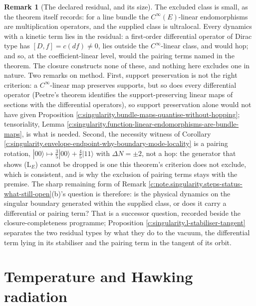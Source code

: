 \documentclass[11pt]{article}
\theoremstyle{definition}
\newtheorem{remark}[theorem]{Remark}
\theoremstyle{plain}
\begin{document}
\begin{remark}[The declared residual, and its size]\label{c:note.singularity.declared-residual-size}
The excluded class is small, as the theorem itself records: for a line bundle the $C^\infty(E)$-linear endomorphisms are multiplication operators, and the supplied class is ultralocal. Every dynamics with a kinetic term lies in the residual: a first-order differential operator of Dirac type has $[D, f] = c(df) \neq 0$, lies outside the $C^\infty$-linear class, and would hop; and so, at the coefficient-linear level, would the pairing terms named in the theorem. The closure constructs none of these, and nothing here excludes one in nature. Two remarks on method. First, support preservation is not the right criterion: a $C^\infty$-linear map preserves supports, but so does every differential operator (Peetre's theorem identifies the support-preserving linear maps of sections with the differential operators), so support preservation alone would not have given Proposition \ref{c:singularity.bundle-maps-quantise-without-hopping}; tensoriality, Lemma \ref{c:singularity.function-linear-endomorphisms-are-bundle-maps}, is what is needed. Second, the necessity witness of Corollary \ref{c:singularity.envelope-endpoint-why-boundary-mode-locality} is a pairing rotation, $|00\rangle \mapsto \tfrac35|00\rangle + \tfrac45|11\rangle$ with $\Delta N = \pm 2$, not a hop: the generator that shows (L$_E$) cannot be dropped is one this theorem's criterion does not exclude, which is consistent, and is why the exclusion of pairing terms stays with the premise. The sharp remaining form of Remark \ref{c:note.singularity.steps-status-what-still-open}(b)'s question is therefore: is the physical dynamics on the singular boundary generated within the supplied class, or does it carry a differential or pairing term? That is a successor question, recorded beside the closure-completeness programme; Proposition \ref{c:singularity.l-stabiliser-tangent} separates the two residual types by what they do to the vacuum, the differential term lying in its stabiliser and the pairing term in the tangent of its orbit.
\end{remark}

\section{Temperature and Hawking radiation}
\end{document}
